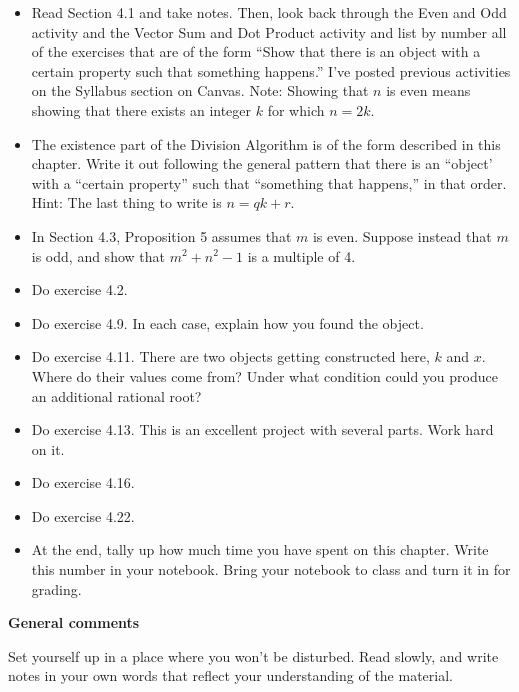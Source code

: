 \begin{itemize}
\item Read  Section 4.1 and take notes.
Then, look back through the Even and Odd activity and the Vector Sum and Dot Product activity and list by number all of the exercises that are of the form ``Show that there is an object with a certain property such that something happens.''
I've posted previous activities on the Syllabus section on Canvas.
Note:  Showing that $n$ is even means showing that there exists an integer $k$ for which $n=2k$.

\item The existence part of the Division Algorithm is of the form described in this chapter.
Write it out following the general pattern that there is an ``object' with a ``certain property'' such that ``something that happens,'' in that order.
Hint:  The last thing to write is $n = qk + r$.

\item In Section 4.3, Proposition 5 assumes that $m$ is even.
Suppose instead that $m$ is odd, and show that $m^2+n^2-1$ is a multiple of 4.

\item Do exercise 4.2.

\item Do exercise 4.9.  In each case, explain how you found the object.

\item Do exercise 4.11.  There are two objects getting constructed here, $k$ and $x$.
Where do their values come from?
Under what condition could you produce an additional rational root?

\item Do exercise 4.13.  This is an excellent project with several parts.  Work hard on it.

\item Do exercise 4.16.

\item Do exercise 4.22.

\item At the end, tally up how much time you have spent on this chapter.
Write this number in your notebook.
Bring your notebook to class and turn it in for grading.
\end{itemize}

\noindent
{\bf General comments}

Set yourself up in a place where you won't be disturbed.
Read slowly, and write notes in your own words that reflect your understanding of the material.
